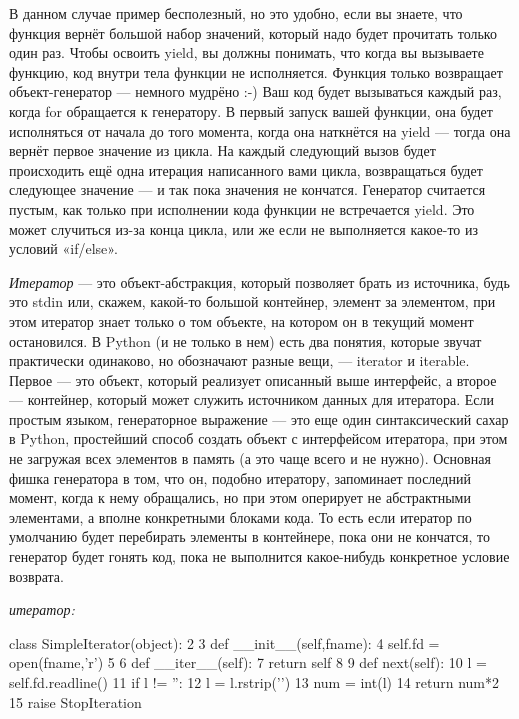 В данном случае пример бесполезный, но это удобно, если вы знаете, что функция вернёт большой набор значений, который надо будет прочитать только один раз.
Чтобы освоить yield, вы должны понимать, что когда вы вызываете функцию, код внутри тела функции не исполняется. Функция только возвращает объект-генератор — немного мудрёно :-)
Ваш код будет вызываться каждый раз, когда for обращается к генератору.
В первый запуск вашей функции, она будет исполняться от начала до того момента, когда она наткнётся на yield — тогда она вернёт первое значение из цикла. На каждый следующий вызов будет происходить ещё одна итерация написанного вами цикла, возвращаться будет следующее значение — и так пока значения не кончатся.
Генератор считается пустым, как только при исполнении кода функции не встречается yield. Это может случиться из-за конца цикла, или же если не выполняется какое-то из условий «if/else».

\textit{Итератор} — это объект-абстракция, который позволяет брать из источника, будь это stdin или, скажем, какой-то большой контейнер, элемент за элементом, при этом итератор знает только о том объекте, на котором он в текущий момент остановился.
В Python (и не только в нем) есть два понятия, которые звучат практически одинаково, но обозначают разные вещи, — iterator и iterable. Первое — это объект, который реализует описанный выше интерфейс, а второе — контейнер, который может служить источником данных для итератора.
Если простым языком, генераторное выражение — это еще один синтаксический сахар в Python, простейший способ создать объект с интерфейсом итератора, при этом не загружая всех элементов в память (а это чаще всего и не нужно).
Основная фишка генератора в том, что он, подобно итератору, запоминает последний момент, когда к нему обращались, но при этом оперирует не абстрактными элементами, а вполне конкретными блоками кода. То есть если итератор по умолчанию будет перебирать элементы в контейнере, пока они не кончатся, то генератор будет гонять код, пока не выполнится какое-нибудь конкретное условие возврата. 

\textit{итератор:}
\begin{python}
class SimpleIterator(object):
 2     
 3     def __init__(self,fname):
 4         self.fd = open(fname,'r')
 5         
 6     def __iter__(self):
 7         return self
 8 
 9     def next(self):
10         l = self.fd.readline()
11         if l != '':
12             l = l.rstrip('\n')
13             num = int(l)
14             return num*2
15         raise StopIteration
\end{python}

